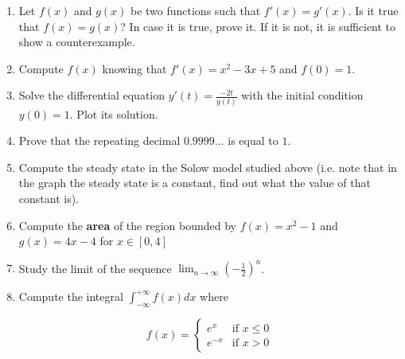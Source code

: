 \documentclass[a4paper,11pt]{article}
\theoremstyle{definition}
\theoremstyle{plain}
\begin{document}
\begin{enumerate}
	\item Let \(f(x)\) and \(g(x)\) be two functions such that \(f'(x) = g'(x)\). Is it true that \(f(x) = g(x)\)? In case it is true, prove it. If it is not, it is sufficient to show a counterexample.

	\item Compute \(f(x)\) knowing that \(f'(x) = x^2 - 3x + 5\) and \(f(0) = 1\).

	\item Solve the differential equation \(y'(t) = \frac{-2t}{y(t)}\) with the initial condition \(y(0) = 1\). Plot its solution.

	\item Prove that the repeating decimal \(0.9999\ldots\) is equal to \(1\).

	\item Compute the steady state in the Solow model studied above (i.e. note that in the graph the steady state is a constant, find out what the value of that constant is).

	\item Compute the \textbf{area} of the region bounded by \(f(x) = x^2-1\) and \(g(x) = 4x-4\) for \(x\in[0, 4]\)
	
	\item Study the limit of the sequence \(\lim_{n\rightarrow\infty}\left(-\frac{1}{2}\right)^{n}\).

	\item Compute the integral \(\int^{+\infty}_{-\infty} f(x)dx\) where
	
	\[
	f(x) = \begin{cases}
	e^x & \text{if } x\leq 0 \\
	e^{-x} & \text{if } x > 0
	\end{cases}
	\]
\end{enumerate}
\end{document}
